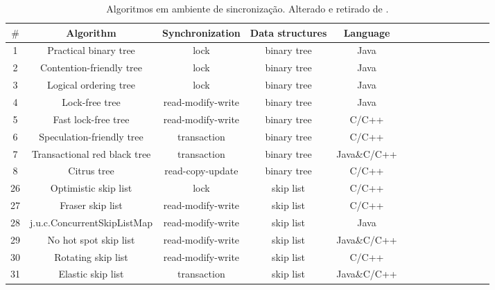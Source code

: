\documentclass[paper=a4, fontsize=11pt]{scrartcl} %
\numberwithin{equation}{section}
\numberwithin{figure}{section}
\numberwithin{table}{section}
\numberwithin{definition}{section}
\numberwithin{theorem}{section}
\numberwithin{property}{section}
\numberwithin{proposition}{section}
\begin{document}
\begin{table}[htpb]
  \centering
  
   
  \begin{tabular}{|c|c|c|c|c|c|c|c|c|c|c|c|c|c|}
  
  \hline
          $\#$&Algorithm & Synchronization & Data structures &Language\\
          \hline
         1&Practical binary tree & lock &  binary tree&Java \\
          \hline
          2&Contention-friendly tree & lock & binary tree &Java\\ 
          \hline
           3&Logical ordering tree & lock &binary tree &Java\\
          \hline
           4&Lock-free tree& read-modify-write &binary tree&Java\\
           \hline
           5&Fast lock-free tree& read-modify-write &binary tree &C/C++\\
           \hline 
           6&Speculation-friendly tree & transaction &binary tree &C/C++\\
          \hline
           7&Transactional red black tree&transaction&binary tree &Java\&C/C++\\ 
          \hline
           8&Citrus tree & read-copy-update &binary tree &C/C++\\
           \hline
           26& Optimistic skip list& lock &skip list &C/C++\\
          \hline
          27&Fraser skip list&read-modify-write&skip list &C/C++\\ 
          \hline
           28 & j.u.c.ConcurrentSkipListMap&read-modify-write &skip list &Java\\
           \hline
           29 &No hot spot skip list &read-modify-write &skip list&Java\&C/C++\\
           \hline
           30 &Rotating skip list &read-modify-write &skip list &C/C++\\
           \hline 
           31 & Elastic skip list &transaction&skip list &Java\&C/C++\\
           \hline 

         
  \end{tabular}

 \caption{Algoritmos em ambiente de sincroniza\c{c}\~{a}o. Alterado e retirado de \cite{Gramoli2015more}.}
 
\end{table}
\end{document}
